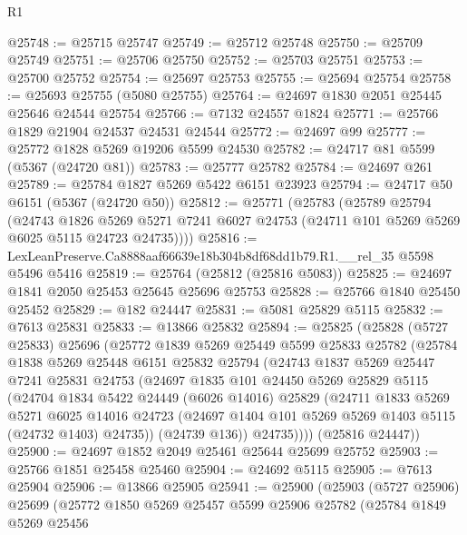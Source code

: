 \begin{lexlean}{R1}
\begin{coremodule}
@25748 := @25715 @25747
@25749 := @25712 @25748
@25750 := @25709 @25749
@25751 := @25706 @25750
@25752 := @25703 @25751
@25753 := @25700 @25752
@25754 := @25697 @25753
@25755 := @25694 @25754
@25758 := @25693 @25755 (@5080 @25755)
@25764 := @24697 @1830 @2051 @25445 @25646 @24544 @25754
@25766 := @7132 @24557 @1824
@25771 := @25766 @1829 @21904 @24537 @24531 @24544
@25772 := @24697 @99
@25777 := @25772 @1828 @5269 @19206 @5599 @24530
@25782 := @24717 @81 @5599 (@5367 (@24720 @81))
@25783 := @25777 @25782
@25784 := @24697 @261
@25789 := @25784 @1827 @5269 @5422 @6151 @23923
@25794 := @24717 @50 @6151 (@5367 (@24720 @50))
@25812 := @25771
    (@25783
      (@25789
        @25794
        (@24743
          @1826
          @5269
          @5271
          @7241
          @6027
          @24753
          (@24711 @101 @5269 @5269 @6025 @5115 @24723 @24735))))
@25816 := LexLeanPreserve.Ca8888aaf66639e18b304b8df68dd1b79.R1.__rel_35 @5598 @5496 @5416
@25819 := @25764 (@25812 (@25816 @5083))
@25825 := @24697 @1841 @2050 @25453 @25645 @25696 @25753
@25828 := @25766 @1840 @25450 @25452
@25829 := @182 @24447
@25831 := @5081 @25829 @5115
@25832 := @7613 @25831
@25833 := @13866 @25832
@25894 := @25825
    (@25828
      (@5727 @25833)
      @25696
      (@25772
        @1839
        @5269
        @25449
        @5599
        @25833
        @25782
        (@25784
          @1838
          @5269
          @25448
          @6151
          @25832
          @25794
          (@24743
            @1837
            @5269
            @25447
            @7241
            @25831
            @24753
            (@24697
              @1835
              @101
              @24450
              @5269
              @25829
              @5115
              (@24704
                @1834
                @5422
                @24449
                (@6026 @14016)
                @25829
                (@24711
                  @1833
                  @5269
                  @5271
                  @6025
                  @14016
                  @24723
                  (@24697 @1404 @101 @5269 @5269 @1403 @5115 (@24732 @1403) @24735))
                (@24739 @136))
              @24735))))
      (@25816 @24447))
@25900 := @24697 @1852 @2049 @25461 @25644 @25699 @25752
@25903 := @25766 @1851 @25458 @25460
@25904 := @24692 @5115
@25905 := @7613 @25904
@25906 := @13866 @25905
@25941 := @25900
    (@25903
      (@5727 @25906)
      @25699
      (@25772
        @1850
        @5269
        @25457
        @5599
        @25906
        @25782
        (@25784
          @1849
          @5269
          @25456

\end{coremodule}
\end{lexlean}
